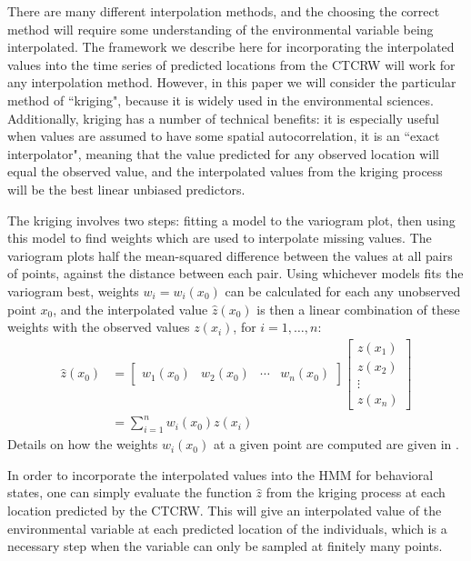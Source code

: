 \documentclass[12pt]{article}
\begin{document}
	There are many different interpolation methods, and the choosing the correct method will require some understanding of the environmental variable being interpolated. The framework we describe here for incorporating the interpolated values into the time series of predicted locations from the CTCRW will work for any interpolation method. However, in this paper we will consider the particular method of ``kriging", because it is widely used in the environmental sciences. Additionally, kriging has a number of technical benefits: it is especially useful when values are assumed to have some spatial autocorrelation, it is an ``exact interpolator", meaning that the value predicted for any observed location will equal the observed value, and the interpolated values from the kriging process will be the best linear unbiased predictors.
	
	The kriging involves two steps: fitting a model to the variogram plot, then using this model to find weights which are used to interpolate missing values. The variogram plots half the mean-squared difference between the values at all pairs of points, against the distance between each pair. Using whichever models fits the variogram best, weights $w_i = w_i(x_0)$ can be calculated for each any unobserved point $x_0$, and the interpolated value $\hat z(x_0)$ is then a linear combination of these weights with the observed values $z(x_i)$, for $i = 1, \ldots, n$:
	\begin{align*}
		\hat z(x_0) &= \begin{bmatrix} w_1(x_0) & w_2(x_0) & \cdots & w_n(x_0) \end{bmatrix} \begin{bmatrix} z(x_1) \\ z(x_2) \\ \vdots \\ z(x_n) \end{bmatrix} \\
		&= \sum_{i = 1}^n w_i(x_0) z(x_i)
	\end{align*}
	Details on how the weights $w_i(x_0)$ at a given point are computed are given in \cite{Bailey1995}.
	
	In order to incorporate the interpolated values into the HMM for behavioral states, one can simply evaluate the function $\hat z$ from the kriging process at each location predicted by the CTCRW. This will give an interpolated value of the environmental variable at each predicted location of the individuals, which is a necessary step when the variable can only be sampled at finitely many points.
	
\end{document}
